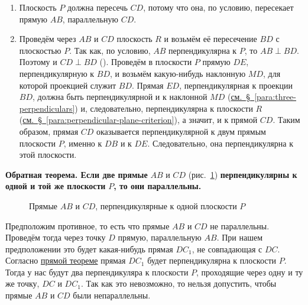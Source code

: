 \begin{enumerate}[label=\arabic*),ref=\arabic*]
    \item Плоскость \(P\) должна пересечь \(CD\), потому что она, по условию, пересекает прямую \(AB\), параллельную \(CD\).
    \item Проведём через \(AB\) и \(CD\) плоскость \(R\) и возьмём её пересечение \(BD\) с плоскостью \(P\). Так как, по условию, \(AB\) перпендикулярна к \(P\), то \(AB\perp BD\). Поэтому и \(CD\perp BD\) (). Проведём в плоскости \(P\) прямую \(DE\), перпендикулярную к \(BD\), и возьмём какую-нибудь наклонную \(MD\), для которой проекцией служит \(BD\). Прямая \(ED\), перпендикулярная к проекции \(BD\), должна быть перпендикулярной и к наклонной \(MD\) (\hyperref[para:three-perpendiculars]{см.~§~\ref*{para:three-perpendiculars}})
    и, следовательно, перпендикулярна к плоскости \(R\) (\hyperref[para:perpendicular-plane-criterion]{см.~§~\ref*{para:perpendicular-plane-criterion}}), а значит, и к прямой \(CD\). Таким образом, прямая \(CD\) оказывается перпендикулярной к двум прямым плоскости \(P\), именно к \(DB\) и к \(DE\). Следовательно, она перпендикулярна к этой плоскости.
\end{enumerate}

 \textbf{Обратная теорема. Если две прямые} \(AB\) и \(CD\) (рис.~\ref{fig:kiselev-stereo-317}) \textbf{перпендикулярны к одной и той же плоскости} \(P\)\textbf{, то они параллельны.}

\begin{figure}[htbp]
    \centering
    \renewcommand{\thefigure}{317}
    \captionsetup{name=Рис.,labelsep=period}
    
    \caption{Прямые \(AB\) и \(CD\), перпендикулярные к одной плоскости \(P\)}\label{fig:kiselev-stereo-317}
\end{figure}

Предположим противное, то есть что прямые \(AB\) и \(CD\) не параллельны. Проведём тогда через точку \(D\) прямую, параллельную \(AB\). При нашем предположении это будет какая-нибудь прямая \(DC_1\), не совпадающая с \(DC\). Согласно \hyperref[para:plane-perpendicular-to-parallel-lines]{прямой теореме} прямая \(DC_1\) будет перпендикулярна к плоскости \(P\). Тогда у нас будут два перпендикуляра к плоскости \(P\), проходящие через одну и ту же точку, \(DC\) и \(DC_1\). Так как это невозможно, то нельзя допустить, чтобы прямые \(AB\) и \(CD\) были непараллельны.


